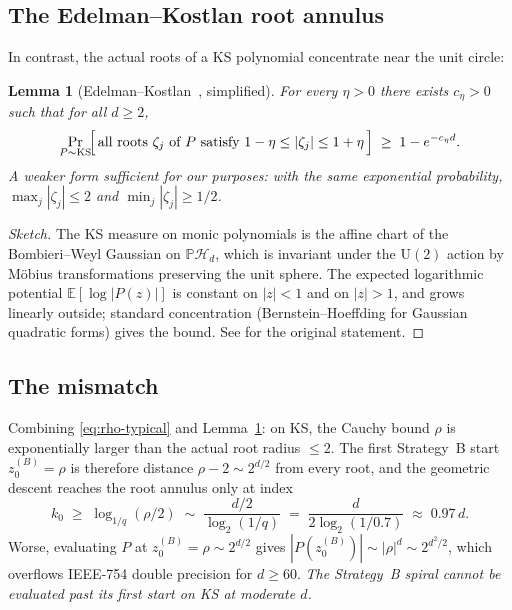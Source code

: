 \documentclass[11pt,a4paper]{article}
\newtheorem{lemma}[theorem]{Lemma}
\begin{document}
\subsection{The Edelman--Kostlan root annulus}

In contrast, the actual roots of a KS polynomial concentrate near the unit circle:

\begin{lemma}[Edelman--Kostlan~\cite{edelmankostlan}, simplified]\label{lem:ek}
For every $\eta > 0$ there exists $c_\eta > 0$ such that for all $d \ge 2$,
\begin{equation}\label{eq:ek}
\Pr_{P \sim \mathrm{KS}}\!\Bigl[\,\text{all roots } \zeta_j \text{ of } P \text{ satisfy } 1 - \eta \le |\zeta_j| \le 1 + \eta \,\Bigr]
\;\ge\; 1 - e^{-c_\eta d}.
\end{equation}
A weaker form sufficient for our purposes: with the same exponential probability, $\max_j |\zeta_j| \le 2$ and $\min_j |\zeta_j| \ge 1/2$.
\end{lemma}

\begin{proof}[Sketch]
The KS measure on monic polynomials is the affine chart of the Bombieri--Weyl Gaussian on $\mathbb{P}\mathcal{H}_d$, which is invariant under the $\mathrm{U}(2)$ action by Möbius transformations preserving the unit sphere. The expected logarithmic potential $\mathbb{E}[\log|P(z)|]$ is constant on $|z| < 1$ and on $|z| > 1$, and grows linearly outside; standard concentration (Bernstein--Hoeffding for Gaussian quadratic forms) gives the bound. See \cite[Theorem~3.4]{edelmankostlan} for the original statement.
\end{proof}

\subsection{The mismatch}

Combining \eqref{eq:rho-typical} and Lemma~\ref{lem:ek}: on KS, the Cauchy bound $\rho$ is exponentially larger than the actual root radius $\le 2$. The first Strategy~B start $z_0^{(B)} = \rho$ is therefore distance $\rho - 2 \sim 2^{d/2}$ from every root, and the geometric descent reaches the root annulus only at index
\begin{equation}\label{eq:k0-cauchy}
k_0 \;\ge\; \log_{1/q}(\rho/2) \;\sim\; \frac{d/2}{\log_2(1/q)} \;=\; \frac{d}{2 \log_2(1/0.7)} \;\approx\; 0.97\, d.
\end{equation}
Worse, evaluating $P$ at $z_0^{(B)} = \rho \sim 2^{d/2}$ gives $|P(z_0^{(B)})| \sim |\rho|^{d} \sim 2^{d^2/2}$, which overflows IEEE-754 double precision for $d \ge 60$. \emph{The Strategy~B spiral cannot be evaluated past its first start on KS at moderate $d$.}
\end{document}
